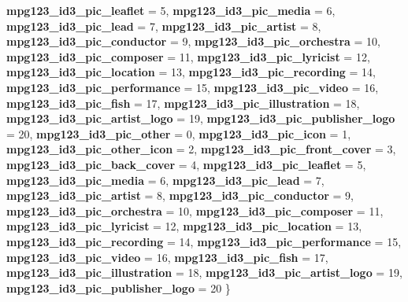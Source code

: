 \begin{DoxyCompactItemize}
{\bfseries mpg123\+\_\+id3\+\_\+pic\+\_\+leaflet} = 5, 
{\bfseries mpg123\+\_\+id3\+\_\+pic\+\_\+media} = 6, 
{\bfseries mpg123\+\_\+id3\+\_\+pic\+\_\+lead} = 7, 
\newline
{\bfseries mpg123\+\_\+id3\+\_\+pic\+\_\+artist} = 8, 
{\bfseries mpg123\+\_\+id3\+\_\+pic\+\_\+conductor} = 9, 
{\bfseries mpg123\+\_\+id3\+\_\+pic\+\_\+orchestra} = 10, 
{\bfseries mpg123\+\_\+id3\+\_\+pic\+\_\+composer} = 11, 
\newline
{\bfseries mpg123\+\_\+id3\+\_\+pic\+\_\+lyricist} = 12, 
{\bfseries mpg123\+\_\+id3\+\_\+pic\+\_\+location} = 13, 
{\bfseries mpg123\+\_\+id3\+\_\+pic\+\_\+recording} = 14, 
{\bfseries mpg123\+\_\+id3\+\_\+pic\+\_\+performance} = 15, 
\newline
{\bfseries mpg123\+\_\+id3\+\_\+pic\+\_\+video} = 16, 
{\bfseries mpg123\+\_\+id3\+\_\+pic\+\_\+fish} = 17, 
{\bfseries mpg123\+\_\+id3\+\_\+pic\+\_\+illustration} = 18, 
{\bfseries mpg123\+\_\+id3\+\_\+pic\+\_\+artist\+\_\+logo} = 19, 
\newline
{\bfseries mpg123\+\_\+id3\+\_\+pic\+\_\+publisher\+\_\+logo} = 20, 
{\bfseries mpg123\+\_\+id3\+\_\+pic\+\_\+other} = 0, 
{\bfseries mpg123\+\_\+id3\+\_\+pic\+\_\+icon} = 1, 
{\bfseries mpg123\+\_\+id3\+\_\+pic\+\_\+other\+\_\+icon} = 2, 
\newline
{\bfseries mpg123\+\_\+id3\+\_\+pic\+\_\+front\+\_\+cover} = 3, 
{\bfseries mpg123\+\_\+id3\+\_\+pic\+\_\+back\+\_\+cover} = 4, 
{\bfseries mpg123\+\_\+id3\+\_\+pic\+\_\+leaflet} = 5, 
{\bfseries mpg123\+\_\+id3\+\_\+pic\+\_\+media} = 6, 
\newline
{\bfseries mpg123\+\_\+id3\+\_\+pic\+\_\+lead} = 7, 
{\bfseries mpg123\+\_\+id3\+\_\+pic\+\_\+artist} = 8, 
{\bfseries mpg123\+\_\+id3\+\_\+pic\+\_\+conductor} = 9, 
{\bfseries mpg123\+\_\+id3\+\_\+pic\+\_\+orchestra} = 10, 
\newline
{\bfseries mpg123\+\_\+id3\+\_\+pic\+\_\+composer} = 11, 
{\bfseries mpg123\+\_\+id3\+\_\+pic\+\_\+lyricist} = 12, 
{\bfseries mpg123\+\_\+id3\+\_\+pic\+\_\+location} = 13, 
{\bfseries mpg123\+\_\+id3\+\_\+pic\+\_\+recording} = 14, 
\newline
{\bfseries mpg123\+\_\+id3\+\_\+pic\+\_\+performance} = 15, 
{\bfseries mpg123\+\_\+id3\+\_\+pic\+\_\+video} = 16, 
{\bfseries mpg123\+\_\+id3\+\_\+pic\+\_\+fish} = 17, 
{\bfseries mpg123\+\_\+id3\+\_\+pic\+\_\+illustration} = 18, 
\newline
{\bfseries mpg123\+\_\+id3\+\_\+pic\+\_\+artist\+\_\+logo} = 19, 
{\bfseries mpg123\+\_\+id3\+\_\+pic\+\_\+publisher\+\_\+logo} = 20
 \}
\end{DoxyCompactItemize}

